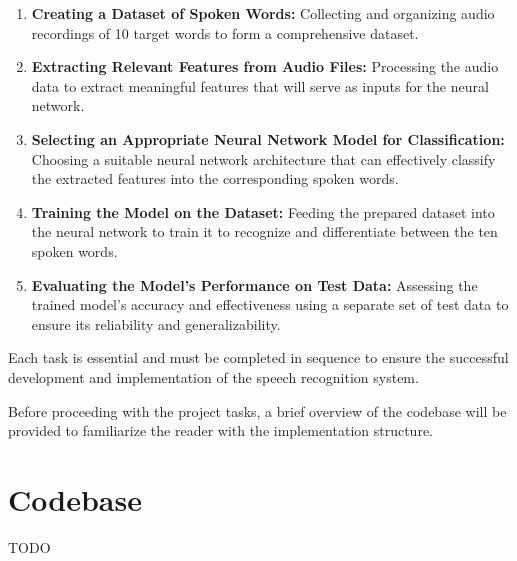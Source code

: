 \documentclass[12pt]{article}
\begin{document}
\begin{enumerate}
    \item \textbf{Creating a Dataset of Spoken Words:} Collecting and organizing audio recordings of 10 target words to form a comprehensive dataset.
    \item \textbf{Extracting Relevant Features from Audio Files:} Processing the audio data to extract meaningful features that will serve as inputs for the neural network.
    \item \textbf{Selecting an Appropriate Neural Network Model for Classification:} Choosing a suitable neural network architecture that can effectively classify the extracted features into the corresponding spoken words.
    \item \textbf{Training the Model on the Dataset:} Feeding the prepared dataset into the neural network to train it to recognize and differentiate between the ten spoken words.
    \item \textbf{Evaluating the Model's Performance on Test Data:} Assessing the trained model's accuracy and effectiveness using a separate set of test data to ensure its reliability and generalizability.
\end{enumerate}

Each task is essential and must be completed in sequence to ensure the successful development and implementation of the speech recognition system.

Before proceeding with the project tasks, a brief overview of the codebase will be provided to familiarize the reader with the implementation structure.

\newpage




\section{Codebase}
TODO


\newpage


\end{document}
